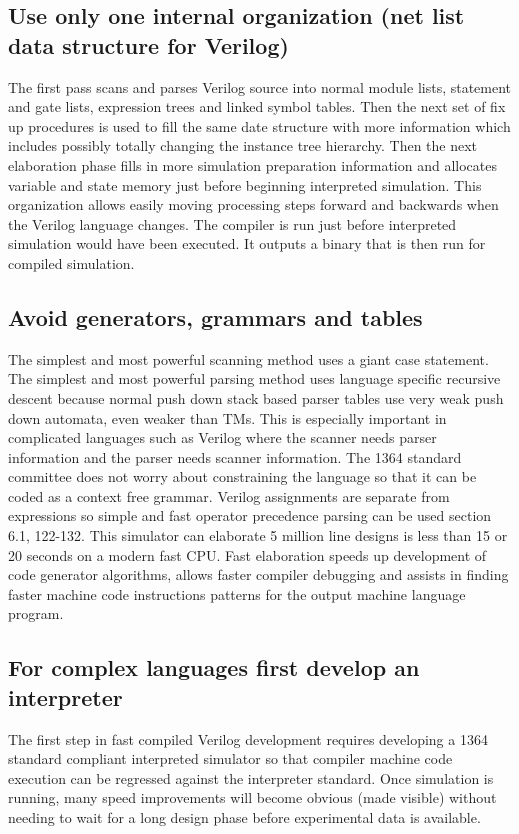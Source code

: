 \documentclass[preprint, authoryear]{sigplanconf}
\begin{document}
\subsection{Use only one internal organization (net list data structure for Verilog)}
\par
The first pass scans and parses Verilog source into normal module lists,
statement and gate lists, expression trees and linked symbol tables.
Then the next set of fix up procedures is used to fill the same date
structure with more information which includes possibly totally changing
the instance tree hierarchy.  Then the next elaboration phase fills in
more simulation preparation information and allocates variable and state
memory just before beginning interpreted simulation.
This organization allows easily
moving processing steps forward and backwards when the Verilog language
changes.  The compiler is run just before interpreted simulation would
have been executed.  It outputs a binary that is then run for compiled
simulation.
\subsection{Avoid generators, grammars and tables}
\par
The simplest and most powerful scanning method uses a giant
case statement.  The simplest and most powerful parsing method
uses language specific recursive descent because normal push
down stack based parser tables use very weak push down automata,
even weaker than TMs.
This is especially important
in complicated languages such as Verilog where the scanner needs parser
information and the parser needs scanner information.  The 1364 standard
committee does not worry about constraining the language
so that it can be coded as a context free grammar.
Verilog assignments are separate from expressions so 
simple and fast operator precedence parsing can be used
\cite{Gries1971} section 6.1, 122-132. 
This simulator can elaborate 5 million line designs is less than 15 or 20
seconds on a modern fast CPU.
Fast elaboration speeds up development of code generator algorithms,
allows faster compiler debugging and assists in finding faster
machine code instructions patterns for the output machine language
program.
\subsection{For complex languages first develop an interpreter}
\par
The first step in fast compiled Verilog development requires developing
a 1364 standard compliant interpreted simulator so that compiler machine
code execution can be regressed against the interpreter standard.
Once simulation is running, many
speed improvements will become obvious (made visible)
without needing to wait for a long design phase
before experimental data is available.
\end{document}
